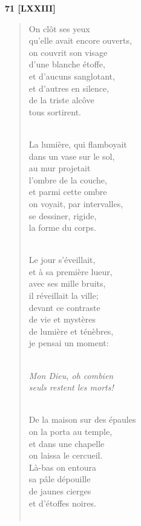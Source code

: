 \documentclass[a4paper,12pt]{book}
\begin{document}
\bigskip

\begin{center} {\bf 71 [LXXIII]} \end{center}

\begin{verse}
On clôt ses yeux \\
qu'elle avait encore ouverts, \\
on couvrit son visage \\
d'une blanche étoffe, \\
et d'aucuns sanglotant, \\
et d'autres en silence, \\
de la triste alcôve \\
tous sortirent. \\ \

La lumière, qui flamboyait \\
dans un vase sur le sol, \\
au mur projetait \\
l'ombre de la couche, \\
et parmi cette ombre \\
on voyait, par intervalles, \\
se dessiner, rigide, \\
la forme du corps. \\ \

Le jour s'éveillait, \\
et à sa première lueur, \\
avec ses mille bruits, \\
il réveillait la ville; \\
devant ce contraste \\
de vie et mystères \\
de lumière et ténèbres, \\
je pensai un moment: \\ \

{\em Mon Dieu, oh combien \\
seuls restent les morts!} \\ \


De la maison sur des épaules \\
on la porta au temple, \\
et dans une chapelle \\
on laissa le cercueil. \\
Là-bas on entoura \\
sa pâle dépouille \\
de jaunes cierges \\
et d'étoffes noires. \\ \


\end{verse}
\end{document}
